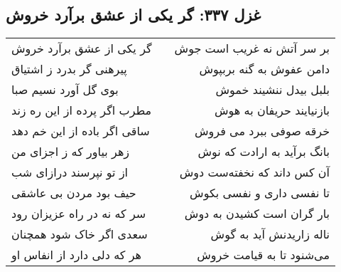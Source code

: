 \begin{center}
\section*{غزل ۳۳۷: گر یکی از عشق برآرد خروش}
\label{sec:337}
\begin{longtable}{l p{0.5cm} r}
گر یکی از عشق برآرد خروش
&&
بر سر آتش نه غریب است جوش
\\
پیرهنی گر بدرد ز اشتیاق
&&
دامن عفوش به گنه بربپوش
\\
بوی گل آورد نسیم صبا
&&
بلبل بیدل ننشیند خموش
\\
مطرب اگر پرده از این ره زند
&&
بازنیایند حریفان به هوش
\\
ساقی اگر باده از این خم دهد
&&
خرقه صوفی ببرد می فروش
\\
زهر بیاور که ز اجزای من
&&
بانگ برآید به ارادت که نوش
\\
از تو نپرسند درازای شب
&&
آن کس داند که نخفته‌ست دوش
\\
حیف بود مردن بی عاشقی
&&
تا نفسی داری و نفسی بکوش
\\
سر که نه در راه عزیزان رود
&&
بار گران است کشیدن به دوش
\\
سعدی اگر خاک شود همچنان
&&
ناله زاریدنش آید به گوش
\\
هر که دلی دارد از انفاس او
&&
می‌شنود تا به قیامت خروش
\\
\end{longtable}
\end{center}
